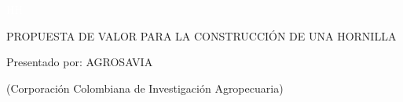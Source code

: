 \documentclass{article}%
\begin{document}
%
\normalsize%
\begin{center}%
\textcolor{white}{%
HH%
}%
\linebreak%
\linebreak%
\linebreak%
\linebreak%
\linebreak%
\linebreak%
\linebreak%
\linebreak%
\linebreak%
\linebreak%
\linebreak%
\linebreak%
\linebreak%
\linebreak%
\linebreak%
\begin{Huge}%
PROPUESTA DE VALOR PARA LA CONSTRUCCIÓN DE UNA HORNILLA%
\end{Huge}%
\linebreak%
\linebreak%
\linebreak%
\linebreak%
\linebreak%
\linebreak%
\linebreak%
\linebreak%
\linebreak%
\linebreak%
\begin{Large}%
Presentado por: AGROSAVIA%
\end{Large}%
\linebreak%
\begin{small}%
(Corporación Colombiana de Investigación Agropecuaria)%
\end{small}%
\end{center}%
\newpage%
\end{document}
